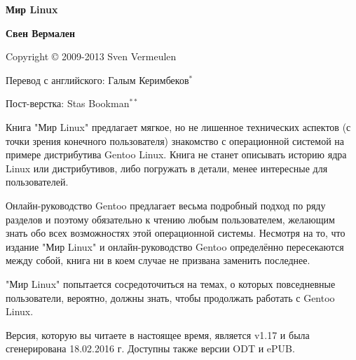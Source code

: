 \documentclass[12pt]{book}
\begin{document}


\pagestyle{empty}
\textbf{Мир Linux}

\phantom{}
\textbf{Свен Вермален}

\phantom{}
Copyright © 2009-2013 Sven Vermeulen

\phantom{}
Перевод с английского: Галым Керимбеков$^{*}$

\phantom{}
Пост-верстка: Stas Bookman$^{**}$

\phantom{}

\phantom{}
\begin{tcolorbox}[colback=yellow!14!white]
\noindent Книга "Мир Linux"{} предлагает мягкое, но не лишенное технических аспектов (с точки зрения конечного пользователя) знакомство с операционной системой на примере дистрибутива Gentoo Linux. Книга не станет описывать историю ядра Linux или дистрибутивов, либо погружать в детали, менее интересные для пользователей.

\phantom{}
\noindent Онлайн-руководство Gentoo предлагает весьма подробный подход по ряду разделов и поэтому обязательно к чтению любым пользователем, желающим знать обо всех возможностях этой операционной системы. Несмотря на то, что издание "Мир Linux"{} и онлайн-руководство Gentoo определённо пересекаются между собой, книга ни в коем случае не призвана заменить последнее.

\phantom{}
\noindent "Мир Linux"{} попытается сосредоточиться на темах, о которых повседневные пользователи, вероятно, должны знать, чтобы продолжать работать с Gentoo Linux.

\phantom{}
\tcblower

\phantom{}
\noindent Версия, которую вы читаете в настоящее время, является v1.17 и была сгенерирована 18.02.2016 г. Доступны также версии ODT и ePUB.
\end{tcolorbox}

\tableofcontents %

\newpage
\end{document}
